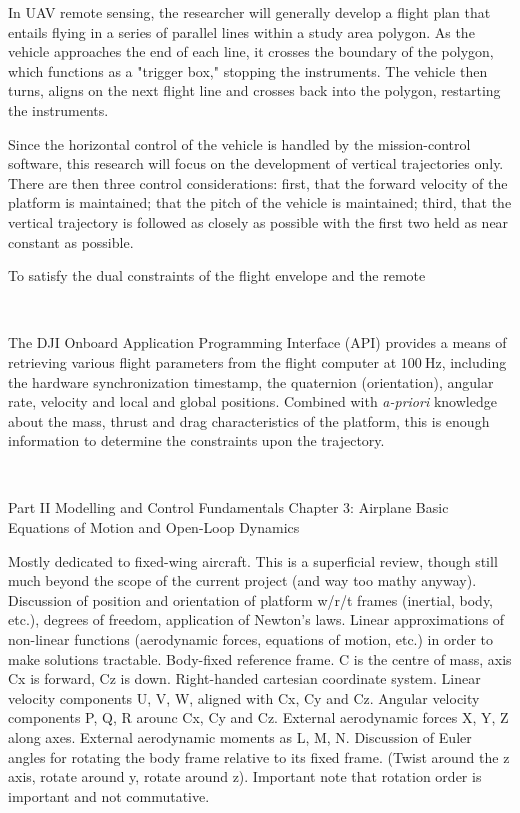 In UAV remote sensing, the researcher will generally develop a flight plan that entails flying in a series of parallel lines within a study area polygon. As the vehicle approaches the end of each line, it crosses the boundary of the polygon, which functions as a "trigger box," stopping the instruments. The vehicle then turns, aligns on the next flight line and crosses back into the polygon, restarting the instruments. 

Since the horizontal control of the vehicle is handled by the mission-control software, this research will focus on the development of vertical trajectories only. There are then three control considerations: first, that the forward velocity of the platform is maintained; that the pitch of the vehicle is maintained; third, that the vertical trajectory is followed as closely as possible with the first two held as near constant as possible.

To satisfy the dual constraints of the flight envelope and the remote


~~~


The DJI Onboard Application Programming Interface (API) \cite{DJI2018} provides a means of retrieving various flight parameters from the flight computer at $\SI{100}\Hz$, including the hardware synchronization timestamp, the quaternion (orientation), angular rate, velocity and local and global positions. Combined with \emph{a-priori} knowledge about the mass, thrust and drag characteristics of the platform, this is enough information to determine the constraints upon the trajectory.




~~~

Part II Modelling and Control Fundamentals
Chapter 3: Airplane Basic Equations of Motion and Open-Loop Dynamics

Mostly dedicated to fixed-wing aircraft.
This is a superficial review, though still much beyond the scope of the current project (and way too mathy anyway).
Discussion of position and orientation of platform w/r/t frames (inertial, body, etc.), degrees of freedom, application of Newton’s laws.
Linear approximations of non-linear functions (aerodynamic forces, equations of motion, etc.) in order to make solutions tractable.
Body-fixed reference frame. C is the centre of mass, axis Cx is forward, Cz is down. Right-handed cartesian coordinate system.
Linear velocity components U, V, W, aligned with Cx, Cy and Cz.
Angular velocity components P, Q, R arounc Cx, Cy and Cz.
External aerodynamic forces X, Y, Z along axes. External aerodynamic moments as L, M, N.
Discussion of Euler angles for rotating the body frame relative to its fixed frame. (Twist around the z axis, rotate around y, rotate around z).
Important note that rotation order is important and not commutative.


